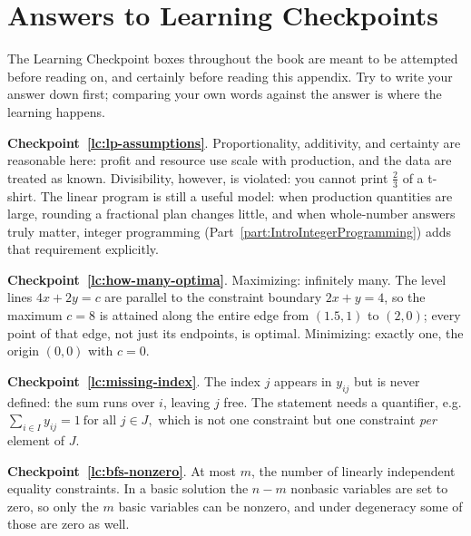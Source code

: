 
\chapter{Answers to Learning Checkpoints}
\label{ch:checkpoint-answers}

The Learning Checkpoint boxes throughout the book are meant to be attempted before reading on, and certainly before reading this appendix. Try to write your answer down first; comparing your own words against the answer is where the learning happens.

\bigskip

\noindent\textbf{Checkpoint~\ref{lc:lp-assumptions}}.
Proportionality, additivity, and certainty are reasonable here: profit and resource use scale with production, and the data are treated as known. Divisibility, however, is violated: you cannot print $\tfrac23$ of a t-shirt. The linear program is still a useful model: when production quantities are large, rounding a fractional plan changes little, and when whole-number answers truly matter, integer programming (Part~\ref{part:IntroIntegerProgramming}) adds that requirement explicitly.

\medskip

\noindent\textbf{Checkpoint~\ref{lc:how-many-optima}}.
Maximizing: infinitely many. The level lines $4x+2y=c$ are parallel to the constraint boundary $2x+y=4$, so the maximum $c=8$ is attained along the entire edge from $(1.5,1)$ to $(2,0)$; every point of that edge, not just its endpoints, is optimal. Minimizing: exactly one, the origin $(0,0)$ with $c=0$.

\medskip

\noindent\textbf{Checkpoint~\ref{lc:missing-index}}.
The index $j$ appears in $y_{ij}$ but is never defined: the sum runs over $i$, leaving $j$ free. The statement needs a quantifier, e.g.
\(\sum_{i \in I} y_{ij} = 1 \ \text{for all } j \in J,\)
which is not one constraint but one constraint \emph{per} element of $J$.

\medskip

\noindent\textbf{Checkpoint~\ref{lc:bfs-nonzero}}.
At most $m$, the number of linearly independent equality constraints. In a basic solution the $n-m$ nonbasic variables are set to zero, so only the $m$ basic variables can be nonzero, and under degeneracy some of those are zero as well.

